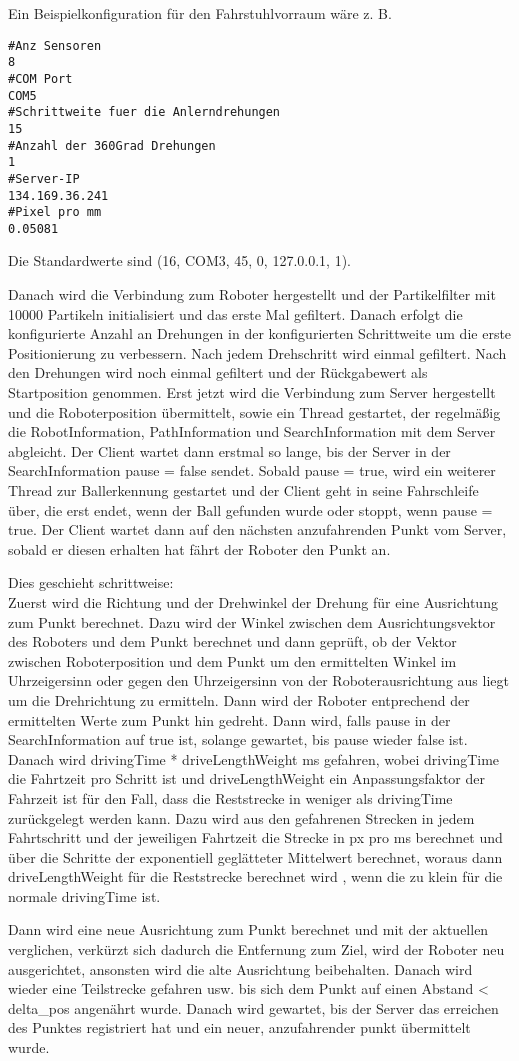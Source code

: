 Ein Beispielkonfiguration für den Fahrstuhlvorraum wäre z. B.
\begin{lstlisting}
#Anz Sensoren
8
#COM Port
COM5
#Schrittweite fuer die Anlerndrehungen
15
#Anzahl der 360Grad Drehungen
1
#Server-IP
134.169.36.241
#Pixel pro mm
0.05081
\end{lstlisting}
Die Standardwerte sind (16, COM3, 45, 0, 127.0.0.1, 1).

Danach wird die Verbindung zum Roboter hergestellt und der Partikelfilter
mit 10000 Partikeln initialisiert und das erste Mal gefiltert. Danach
erfolgt die konfigurierte Anzahl an Drehungen in der konfigurierten
Schrittweite um die erste Positionierung zu verbessern. Nach jedem
Drehschritt wird einmal gefiltert. Nach den Drehungen wird noch einmal
gefiltert und der Rückgabewert als Startposition genommen. Erst jetzt wird
die Verbindung zum Server hergestellt und die Roboterposition übermittelt,
sowie ein Thread gestartet, der regelmäßig die RobotInformation,
PathInformation und SearchInformation mit dem Server abgleicht. Der Client
wartet dann erstmal so lange, bis der Server in der SearchInformation pause
 = false sendet. Sobald pause = true, wird ein weiterer Thread zur
Ballerkennung gestartet und der Client geht in seine Fahrschleife über, die
 erst endet, wenn der Ball gefunden wurde oder stoppt, wenn pause = true.
 Der Client wartet dann auf den nächsten anzufahrenden Punkt vom Server,
sobald er diesen erhalten hat fährt der Roboter den Punkt an.

Dies geschieht schrittweise:\\
Zuerst wird die Richtung und der Drehwinkel der Drehung für eine
Ausrichtung zum Punkt berechnet. Dazu wird der Winkel zwischen dem
Ausrichtungsvektor des Roboters und dem Punkt berechnet und dann geprüft,
ob der Vektor zwischen Roboterposition und dem Punkt um den ermittelten
Winkel im Uhrzeigersinn oder gegen den Uhrzeigersinn von der
Roboterausrichtung aus liegt um die Drehrichtung zu ermitteln. Dann wird
der Roboter entprechend der ermittelten Werte zum Punkt hin gedreht.
Dann wird, falls pause in der SearchInformation auf true ist, solange
gewartet, bis pause wieder false ist. Danach wird
drivingTime * driveLengthWeight ms gefahren, wobei drivingTime die
Fahrtzeit pro Schritt ist und driveLengthWeight ein Anpassungsfaktor der
Fahrzeit ist für den Fall, dass die Reststrecke in weniger als drivingTime
zurückgelegt werden kann. Dazu wird aus den gefahrenen Strecken in jedem
Fahrtschritt und der jeweiligen Fahrtzeit die Strecke in px pro ms
berechnet und über die Schritte der exponentiell geglätteter Mittelwert
berechnet, woraus dann driveLengthWeight für die Reststrecke berechnet wird
, wenn die zu klein für die normale drivingTime ist.

Dann wird eine neue Ausrichtung zum Punkt berechnet und mit der aktuellen
 verglichen, verkürzt sich dadurch die Entfernung zum Ziel, wird der
Roboter neu ausgerichtet, ansonsten wird die alte Ausrichtung beibehalten.
Danach wird wieder eine Teilstrecke gefahren usw. bis sich dem Punkt auf
einen Abstand < delta\_pos angenährt wurde.
Danach wird gewartet, bis der Server das erreichen des Punktes registriert
hat und ein neuer, anzufahrender punkt übermittelt wurde.






